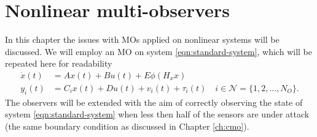 \section{Nonlinear multi-observers}\label{ch:nonlinear-mos}
In this chapter the issues with MOs applied on nonlinear systems will be discussed. We will employ an MO on system \eqref{eqn:standard-system}, which will be repeated here for readability
\begin{equation*}
    \begin{split}
        \dot{x}(t) &= Ax(t) + Bu(t) + E\phi(H_xx) \\
        y_i(t) &= C_ix(t) + Du(t) + v_i(t) + \tau_i(t) \quad i \in \mathcal{N} = \{1,2,\dots,N_O\}.
    \end{split}
\end{equation*}
The observers will be extended with the aim of correctly observing the state of system \eqref{eqn:standard-system} when less then half of the sensors are under attack (the same boundary condition as discussed in Chapter \ref{ch:cmo}).

